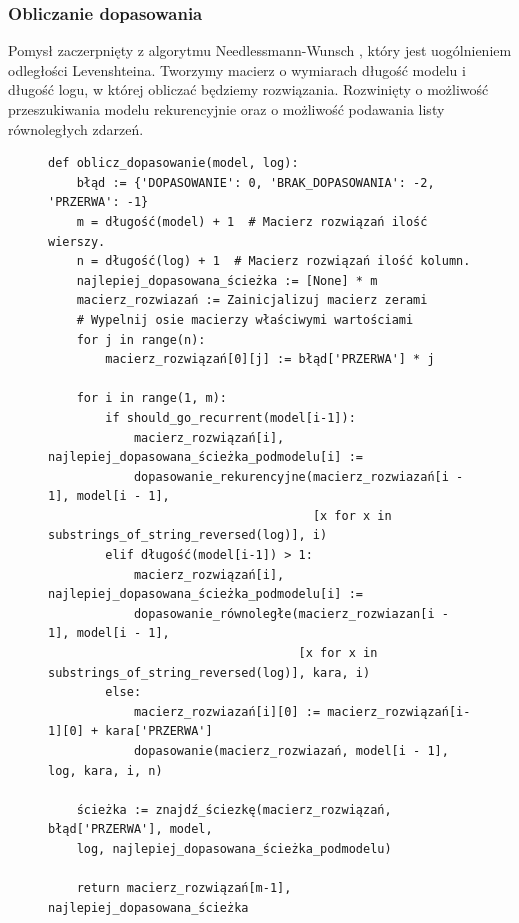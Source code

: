 \subsubsection{Obliczanie dopasowania}
Pomysł zaczerpnięty z algorytmu Needlessmann-Wunsch \cite{ea252fd3937a4a309a5e07e61e5531a7}, który jest uogólnieniem odległości Levenshteina. Tworzymy macierz o wymiarach długość modelu i długość logu, w której obliczać będziemy rozwiązania. Rozwinięty o możliwość przeszukiwania modelu rekurencyjnie oraz o możliwość podawania listy równoległych zdarzeń. 
\begin{figure}[!ht]
\lstset{caption=Obliczanie dopasowania, captionpos=b}
\lstset{label=src:alignment_calculation, frame=single}
\begin{lstlisting}
def oblicz_dopasowanie(model, log):
    błąd := {'DOPASOWANIE': 0, 'BRAK_DOPASOWANIA': -2, 'PRZERWA': -1}
    m = długość(model) + 1  # Macierz rozwiązań ilość wierszy.
    n = długość(log) + 1  # Macierz rozwiązań ilość kolumn.
    najlepiej_dopasowana_ścieżka := [None] * m
    macierz_rozwiazań := Zainicjalizuj macierz zerami
    # Wypelnij osie macierzy właściwymi wartościami
    for j in range(n):
        macierz_rozwiązań[0][j] := błąd['PRZERWA'] * j

    for i in range(1, m):
        if should_go_recurrent(model[i-1]):
            macierz_rozwiązań[i], najlepiej_dopasowana_ścieżka_podmodelu[i] := 
            dopasowanie_rekurencyjne(macierz_rozwiazań[i - 1], model[i - 1],
                                     [x for x in substrings_of_string_reversed(log)], i)
        elif długość(model[i-1]) > 1:
            macierz_rozwiązań[i], najlepiej_dopasowana_ścieżka_podmodelu[i] := 
            dopasowanie_równoległe(macierz_rozwiazan[i - 1], model[i - 1],
                                   [x for x in substrings_of_string_reversed(log)], kara, i)
        else:
            macierz_rozwiazań[i][0] := macierz_rozwiązań[i-1][0] + kara['PRZERWA']
            dopasowanie(macierz_rozwiazań, model[i - 1], log, kara, i, n)

    ścieżka := znajdź_ściezkę(macierz_rozwiązań, błąd['PRZERWA'], model, 
    log, najlepiej_dopasowana_ścieżka_podmodelu)

    return macierz_rozwiązań[m-1], najlepiej_dopasowana_ścieżka
\end{lstlisting}
\end{figure}

